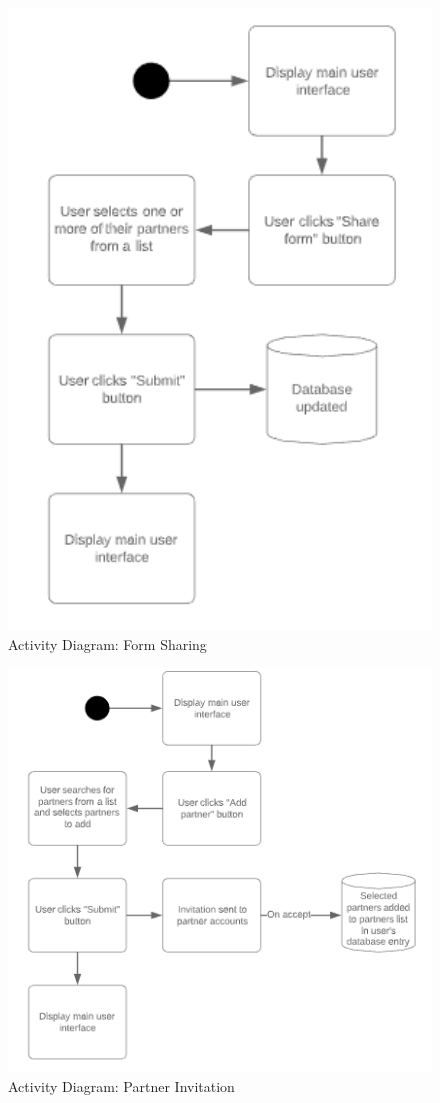         \begin{figure}[!h]
            \center
            \includegraphics[width=120mm]{../figures/ActivityDiagramFormSharing}
            \caption{Activity Diagram: Form Sharing}
        \end{figure}

        \pagebreak

        \begin{figure}[!h]
            \center
            \includegraphics[width=120mm]{../figures/ActivityDiagramPartnerInvitation}
            \caption{Activity Diagram: Partner Invitation}
        \end{figure}

